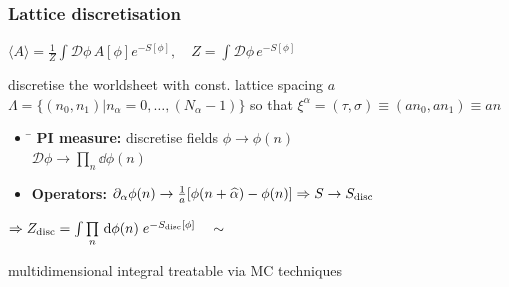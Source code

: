 \documentclass{beamer}
\newcommand{\del}{\partial}
\begin{document}
\begin{frame}
\frametitle{Lattice discretisation}
\begin{minipage}{0.65\linewidth}
\begin{tcolorbox}[colback=white!95!black, colframe=white!90!black]
{\small ${\!\!\!\!\!\!\!\langle A \rangle = \tfrac{1}{Z}\int \mathcal{D}\phi\, A[\phi]e^{-S[\phi]}, \quad Z=\int \mathcal{D}\phi\,e^{-S[\phi]}}$}
\end{tcolorbox}%
discretise the worldsheet with const. lattice spacing $a$ \\
{\small$\mathit{\Lambda}=\lbrace(n_{0},n_{1})\vert n_{\alpha}=0,\ldots,(N_{\alpha}-1)\rbrace$} so that {\small$\xi^{\alpha}=(\tau,\sigma)\equiv (an_{0},an_{1}) \equiv an$}
\end{minipage}
\begin{minipage}{0.3\linewidth}
\end{minipage}

%
\begin{itemize}
\item 
\begin{tabbing}
\hspace{3cm}\=\kill
 \textbf{PI measure:} \> discretise fields $\phi \to \phi(n)$ \\ 
   \> $\mathcal{D}\phi \to \prod\limits_{n} \dd \phi(n)$
\end{tabbing} 
\item \textbf{Operators: } $\del_{\alpha}\phi(n) \to \tfrac{1}{a}[\phi(n+\hat{\alpha})-\phi(n)] \Rightarrow S \to S_{\rm disc}$
\end{itemize}\hfill
\begin{minipage}{0.6\linewidth}
$\Rightarrow Z_{\rm disc} = \int \prod\limits_{n} \, \mathrm{d}\phi(n)\; e^{-S_{\rm disc}[\phi]}\quad\sim$
\end{minipage} 
\begin{minipage}{0.38\linewidth}
multidimensional integral treatable via MC techniques
\end{minipage}
\end{frame}
\end{document}
